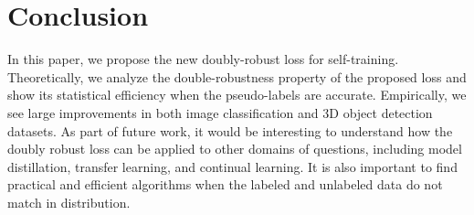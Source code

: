 \section{Conclusion}

In this paper, we propose the new doubly-robust loss for self-training. Theoretically, we analyze the double-robustness property of the proposed loss and show its statistical efficiency when the pseudo-labels are accurate. Empirically, we see large improvements in both image classification and 3D object detection datasets.  As part of future work, it would be interesting to understand how the doubly robust loss can be applied to other domains of questions, including model distillation, transfer learning, and continual learning. It is also important to find practical and efficient algorithms when the labeled and unlabeled data do not match in distribution. 







